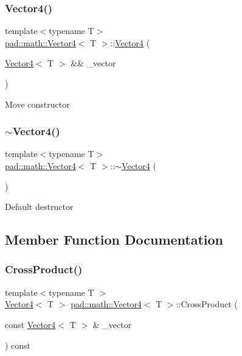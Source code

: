 \subsubsection{\texorpdfstring{Vector4()}{Vector4()}\hspace{0.1cm}{\footnotesize\ttfamily [5/5]}}
{\footnotesize\ttfamily template$<$typename T$>$ \\
\mbox{\hyperlink{structpad_1_1math_1_1_vector4}{pad\+::math\+::\+Vector4}}$<$ T $>$\+::\mbox{\hyperlink{structpad_1_1math_1_1_vector4}{Vector4}} (\begin{DoxyParamCaption}\item[{\mbox{\hyperlink{structpad_1_1math_1_1_vector4}{Vector4}}$<$ T $>$ \&\&}]{\+\_\+vector }\end{DoxyParamCaption})\hspace{0.3cm}{\ttfamily [default]}}

Move constructor \mbox{\label{structpad_1_1math_1_1_vector4_adf02f843943a3524de2add168b4d4903}} 
\subsubsection{\texorpdfstring{$\sim$\+Vector4()}{~Vector4()}}
{\footnotesize\ttfamily template$<$typename T$>$ \\
\mbox{\hyperlink{structpad_1_1math_1_1_vector4}{pad\+::math\+::\+Vector4}}$<$ T $>$\+::$\sim$\mbox{\hyperlink{structpad_1_1math_1_1_vector4}{Vector4}} (\begin{DoxyParamCaption}{ }\end{DoxyParamCaption})\hspace{0.3cm}{\ttfamily [default]}}

Default destructor 

\subsection{Member Function Documentation}
\mbox{\label{structpad_1_1math_1_1_vector4_a46ae48163a69e577092edb42b67ae84d}} 
\subsubsection{\texorpdfstring{Cross\+Product()}{CrossProduct()}}
{\footnotesize\ttfamily template$<$typename T $>$ \\
\mbox{\hyperlink{structpad_1_1math_1_1_vector4}{Vector4}}$<$ T $>$ \mbox{\hyperlink{structpad_1_1math_1_1_vector4}{pad\+::math\+::\+Vector4}}$<$ T $>$\+::Cross\+Product (\begin{DoxyParamCaption}\item[{const \mbox{\hyperlink{structpad_1_1math_1_1_vector4}{Vector4}}$<$ T $>$ \&}]{\+\_\+vector }\end{DoxyParamCaption}) const}

